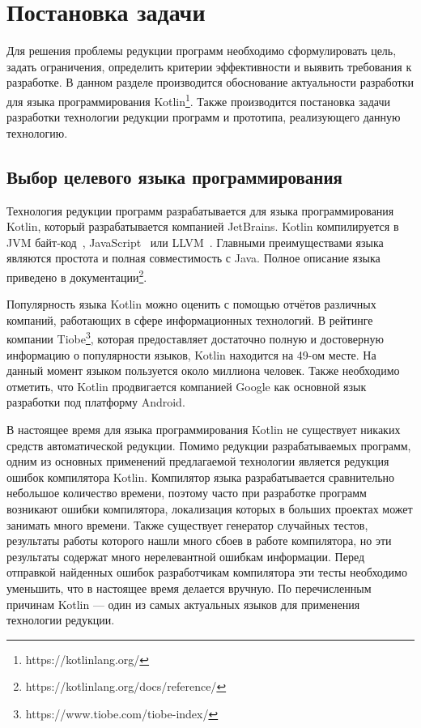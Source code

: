 \chapter{Постановка задачи}
Для решения проблемы редукции программ необходимо сформулировать цель, задать ограничения, определить критерии эффективности и выявить требования к разработке. В данном разделе производится обоснование актуальности разработки для языка программирования Kotlin\footnote{https://kotlinlang.org/}. Также производится постановка задачи разработки технологии редукции программ и прототипа, реализующего данную технологию.

\section{Выбор целевого языка программирования}
Технология редукции программ разрабатывается для языка программирования Kotlin, который разрабатывается компанией JetBrains. Kotlin компилируется в JVM байт-код~\cite{dahm1999byte}, JavaScript~\cite{flanagan2006javascript} или LLVM~\cite{lattner2004llvm}. Главными преимуществами языка являются простота и полная совместимость с Java. Полное описание языка приведено в документации\footnote{https://kotlinlang.org/docs/reference/}.

Популярность языка Kotlin можно оценить с помощью отчётов раз­личных компаний, работающих в сфере информационных технологий. В рейтинге компании Tiobe\footnote{https://www.tiobe.com/tiobe-index/}, которая предоставляет достаточно полную и достоверную информацию о популярности языков, Kotlin находится на 49-ом месте. На данный момент языком пользуется около миллиона человек. Также необходимо отметить, что Kotlin продвигается компанией Google как основной язык разработки под платформу Android. 

В настоящее время для языка программирования Kotlin не существует никаких средств автоматической редукции. Помимо редукции разрабатываемых программ, одним из основных применений предлагаемой технологии является редукция ошибок компилятора Kotlin. Компилятор языка разрабатывается сравнительно небольшое количество времени, поэтому часто при разработке программ возникают ошибки компилятора, локализация которых в больших проектах может занимать много времени. Также существует генератор случайных тестов, результаты работы которого нашли много сбоев в работе компилятора, но эти результаты содержат много нерелевантной ошибкам информации. Перед отправкой найденных ошибок разработчикам компилятора эти тесты необходимо уменьшить, что в настоящее время делается вручную. По перечисленным причинам Kotlin --- один из самых актуальных языков для применения технологии редукции.
